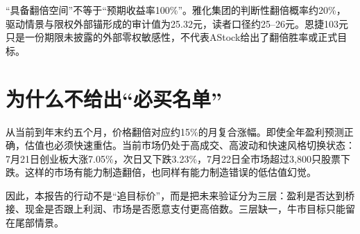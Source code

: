 \begin{riskbox}[最容易误读的地方]
“具备翻倍空间”不等于“预期收益率100\%”。雅化集团的判断性翻倍概率约20\%，驱动情景与限权外部锚形成的审计值为25.32元，读者口径约25--26元。恩捷103元只是一份期限未披露的外部零权敏感性，不代表AStock给出了翻倍胜率或正式目标。
\end{riskbox}

\section{为什么不给出“必买名单”}

从当前到年末约五个月，价格翻倍对应约15\%的月复合涨幅。即使全年盈利预测正确，估值也必须快速重估。当前市场仍处于高成交、高波动和快速风格切换状态：7月21日创业板大涨7.05\%，次日又下跌3.23\%，7月22日全市场超过3,800只股票下跌。这样的市场有能力制造翻倍，也同样有能力制造错误的低估值幻觉。

因此，本报告的行动不是“追目标价”，而是把未来验证分为三层：盈利是否达到桥接、现金是否跟上利润、市场是否愿意支付更高倍数。三层缺一，牛市目标只能留在尾部情景。

\clearpage
